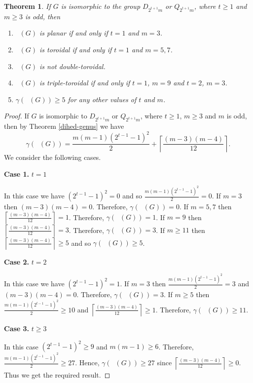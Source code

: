 \documentclass[reqno,12pt]{amsart}
\theoremstyle{plain}
\newtheorem{thm}{Theorem}[section]
\theoremstyle{definition}
\newcommand{\coeng}{\mathop{\mathcal{E}_c^-}}
\begin{document}
\begin{thm}
If $G$ is isomorphic to  the group $D_{2^{t+1}m}$ or $Q_{2^{t+1}m}$,  where $t \geq 1$ and $m \geq 3$ is odd, then
\begin{enumerate}
\item $\coeng(G)$ is planar if and only if $t = 1$ and $m = 3$.
\item $\coeng(G)$ is toroidal if and only if $t = 1$ and $m = 5, 7$.
\item $\coeng(G)$ is not double-toroidal.
\item $\coeng(G)$ is triple-toroidal if and only if $t = 1$, $m = 9$ and $t = 2$, $m = 3$.
\item  $\gamma(\coeng(G)) \geq 5$ for any other values of $t$ and $m$.
\end{enumerate} 
\end{thm}
\begin{proof}
If $G$ is isomorphic to  $D_{2^{t+1}m}$ or $Q_{2^{t+1}m}$, where $t \geq 1$, $m \geq 3$ and $m$ is odd, then
by Theorem \ref{dihed-genus} we have
\[
\gamma(\coeng(G))  = \frac{m(m - 1)(2^{t-1}-1)^2}{2} + \left\lceil \frac{(m-3)(m-4)}{12}\right
\rceil.
\]
We consider the following cases.

\noindent \textbf{Case 1.} $t = 1$ 	

In this case  we have $(2^{t-1}-1)^2 = 0$  and so  $\frac{m(m - 1)(2^{t-1}-1)^2}{2} = 0$. If  $m = 3$ then  $(m - 3)(m - 4) =0$. Therefore,  $\gamma(\coeng(G)) = 0$. If $m = 5, 7$ then $\left\lceil \frac{(m-3)(m-4)}{12}\right\rceil = 1$.    Therefore,  $\gamma(\coeng(G)) = 1$. If $m = 9$ then $\left\lceil \frac{(m-3)(m-4)}{12}\right\rceil = 3$.    Therefore,  $\gamma(\coeng(G)) = 3$. If $m \geq 11$ then $\left\lceil \frac{(m-3)(m-4)}{12}\right\rceil \geq 5$ and so  $\gamma(\coeng(G)) \geq 5$.

\noindent \textbf{Case 2.} $t = 2$ 	

In this case  we have $(2^{t-1}-1)^2 = 1$. If $m = 3$ then $\frac{m(m - 1)(2^{t-1}-1)^2}{2} = 3$ and $(m - 3)(m - 4) =0$. Therefore,  $\gamma(\coeng(G)) = 3$. If $ m \geq 5$ then $\frac{m(m - 1)(2^{t-1}-1)^2}{2} \geq 10$ and  $\left\lceil \frac{(m-3)(m-4)}{12}\right\rceil \geq 1$. Therefore, $\gamma(\coeng(G)) \geq 11$.

\noindent \textbf{Case 3.} $t \geq 3$ 	

In this case $(2^{t-1}-1)^2 \geq 9$ and $m(m-1) \geq 6$. Therefore, $\frac{m(m - 1)(2^{t-1}-1)^2}{2} \geq 27$. Hence, $\gamma(\coeng(G)) \geq 27$ since  $\left\lceil \frac{(m-3)(m-4)}{12}\right\rceil \geq 0$.
Thus we get the required result.
\end{proof}
\end{document}
